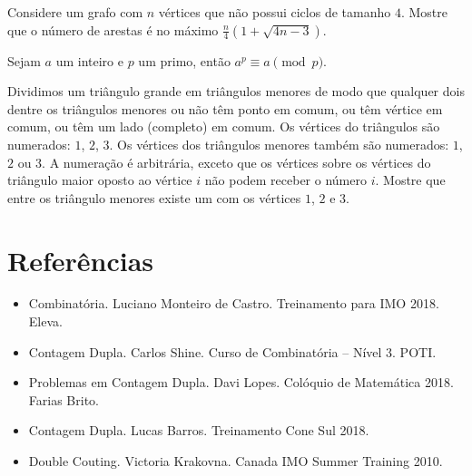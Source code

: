 \documentclass[10pt, a4paper]{article}
\begin{document}


	\begin{prob} %
		Considere um grafo com $n$ vértices que não possui ciclos de tamanho $4$. Mostre que o número de arestas é no máximo $\frac{n}{4}(1 + \sqrt{4n - 3})$.
	\end{prob}


	


	\begin{prob}
		Sejam $a$ um inteiro e $p$ um primo, então $a^p \equiv a \pmod{p}$.
	\end{prob}

	\begin{prob} %
		Dividimos um triângulo grande em triângulos menores de modo que qualquer dois dentre os triângulos menores ou não têm ponto em comum, ou têm vértice em comum, ou têm um lado (completo) em comum. Os vértices do triângulos são numerados: $1$, $2$, $3$. Os vértices dos triângulos menores também são numerados: $1$, $2$ ou $3$. A numeração é arbitrária, exceto que os vértices sobre os vértices do triângulo maior oposto ao vértice $i$ não podem receber o número $i$. Mostre que entre os triângulo menores existe um com os vértices $1$, $2$ e $3$.
	\end{prob}


	\section*{Referências}

	\begin{itemize}
		\item Combinatória. Luciano Monteiro de Castro. Treinamento para IMO 2018. Eleva.
		\item Contagem Dupla. Carlos Shine. Curso de Combinatória -- Nível 3. POTI.
		\item Problemas em Contagem Dupla. Davi Lopes. Colóquio de Matemática 2018. Farias Brito.
		\item Contagem Dupla. Lucas Barros. Treinamento Cone Sul 2018.
		\item Double Couting. Victoria Krakovna. Canada IMO Summer Training 2010.
	\end{itemize}
\end{document}

